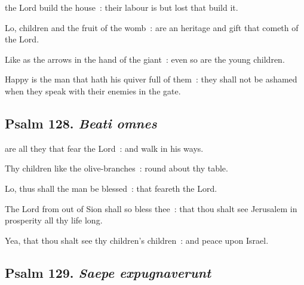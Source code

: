 
 the Lord build the house~: their labour is but lost that build it.\par
{}
Lo, children and the fruit of the womb~: are an heritage and gift that cometh of the Lord.\par
{}Like as the arrows in the hand of the giant~: even so are the young children.\par
{}Happy is the man that hath his quiver full of them~: they shall not be ashamed when they speak with their enemies in the gate.\par

\subsection{Psalm 128. \textit{Beati omnes}}


 are all they that fear the Lord~: and walk in his ways.\par
{}
Thy children like the olive-branches~: round about thy table.\par
{}Lo, thus shall the man be blessed~: that feareth the Lord.\par
{}The Lord from out of Sion shall so bless thee~: that thou shalt see Jerusalem in prosperity all thy life long.\par
{}Yea, that thou shalt see thy children's children~: and peace upon Israel.\par

\subsection{Psalm 129. \textit{Saepe expugnaverunt}}


